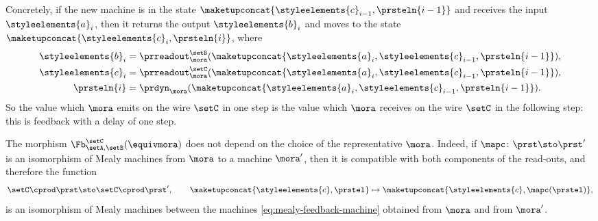 \begin{example}
    Concretely, if the new machine is in the state $\maketupconcat{\styleelements{c}_{i-1}, \prsteln{i-1}}$ and receives the input $\styleelements{a}_i$, then it returns the output $\styleelements{b}_i$ and moves to the state $\maketupconcat{\styleelements{c}_i, \prsteln{i}}$, where
    \begin{equation}
        \label{eq:mealy-feedback-steps}
        \begin{aligned}
            \styleelements{b}_i         & = \prreadout_\mora^{\setB}(\maketupconcat{\styleelements{a}_i, \styleelements{c}_{i-1}, \prsteln{i-1}}), \\
            \styleelements{c}_i         & = \prreadout_\mora^{\setC}(\maketupconcat{\styleelements{a}_i, \styleelements{c}_{i-1}, \prsteln{i-1}}), \\
            \prsteln{i} & = \prdyn_\mora(\maketupconcat{\styleelements{a}_i, \styleelements{c}_{i-1}, \prsteln{i-1}}).
        \end{aligned}
    \end{equation}
    So the value which $\mora$ emits on the wire $\setC$ in one step is the value which $\mora$ receives on the wire $\setC$ in the following step: this is feedback with a delay of one step.

    The morphism $\Fb_{\setA, \setB}^{\setC}(\equivmora)$ does not depend on the choice of the representative $\mora$.
    Indeed, if $\mapc \colon \prst \sto \prst'$ is an isomorphism of Mealy machines from $\mora$ to a machine $\mora'$, then it is compatible with both components of the read-outs, and therefore the function
    \begin{equation}
        \setC \cprod \prst \sto \setC \cprod \prst', \qquad \maketupconcat{\styleelements{c}, \prstel} \mapsto \maketupconcat{\styleelements{c}, \mapc(\prstel)},
    \end{equation}
    is an isomorphism of Mealy machines between the machines \cref{eq:mealy-feedback-machine} obtained from $\mora$ and from $\mora'$.


\end{example}
